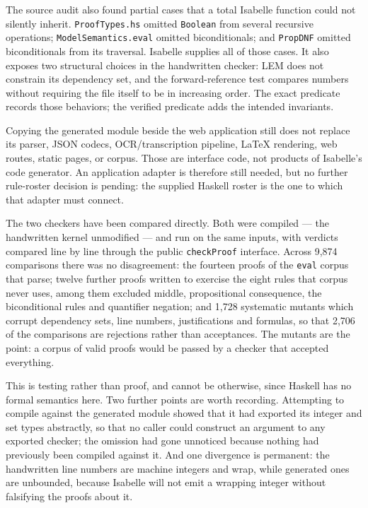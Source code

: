 \documentclass[11pt]{article}
\theoremstyle{plain}
\theoremstyle{definition}
\theoremstyle{remark}
\begin{document}
The source audit also found partial cases that a total Isabelle function could
not silently inherit. \verb|ProofTypes.hs| omitted \verb|Boolean| from several
recursive operations; \texttt{ModelSemantics.}\allowbreak\texttt{eval}
omitted biconditionals; and
\verb|PropDNF| omitted biconditionals from its traversal. Isabelle supplies
all of those cases. It also exposes two structural choices in the handwritten
checker: LEM does not constrain its dependency set, and the forward-reference
test compares numbers without requiring the file itself to be in increasing
order. The exact predicate records those behaviors; the verified predicate
adds the intended invariants.

Copying the generated module beside the web application still does not replace
its parser, JSON codecs, OCR/transcription pipeline, LaTeX rendering, web
routes, static pages, or corpus. Those are interface code, not products of
Isabelle's code generator. An application adapter is therefore still needed,
but no further rule-roster decision is pending: the supplied Haskell roster is
the one to which that adapter must connect.

The two checkers have been compared directly. Both were compiled --- the
handwritten kernel unmodified --- and run on the same inputs, with verdicts
compared line by line through the public \verb|checkProof| interface. Across
9{,}874 comparisons there was no disagreement: the fourteen proofs of the
\verb|eval| corpus that parse; twelve further proofs written to exercise the
eight rules that corpus never uses, among them excluded middle, propositional
consequence, the biconditional rules and quantifier negation; and 1{,}728
systematic mutants which corrupt dependency sets, line numbers, justifications
and formulas, so that 2{,}706 of the comparisons are rejections rather than
acceptances. The mutants are the point: a corpus of valid proofs would be
passed by a checker that accepted everything.

This is testing rather than proof, and cannot be otherwise, since Haskell has
no formal semantics here. Two further points are worth recording. Attempting
to compile against the generated module showed that it had exported its
integer and set types abstractly, so that no caller could construct an
argument to any exported checker; the omission had gone unnoticed because
nothing had previously been compiled against it. And one divergence is
permanent: the handwritten line numbers are machine integers and wrap, while
generated ones are unbounded, because Isabelle will not emit a wrapping
integer without falsifying the proofs about it.
\end{document}
